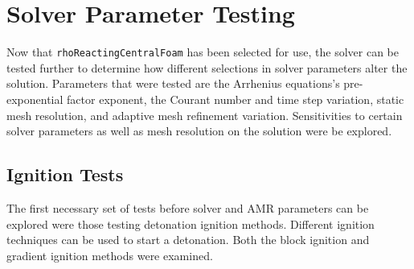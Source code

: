 \chapter{Solver Parameter Testing}
\label{solvtestchap}







Now that \verb|rhoReactingCentralFoam| has been selected for use, the solver can be tested further to determine how different selections in solver parameters alter the solution. Parameters that were tested are the Arrhenius equations's pre-exponential factor exponent, the Courant \cite{courant} number and time step variation, static mesh resolution, and adaptive mesh refinement variation. Sensitivities to certain solver parameters as well as mesh resolution on the solution were be explored. 



\section{Ignition Tests}
\label{sec:igstudy}
The first necessary set of tests before solver and AMR parameters can be explored were those testing detonation ignition methods. Different ignition techniques can be used to start a detonation. Both the block ignition and gradient ignition methods were examined. 

